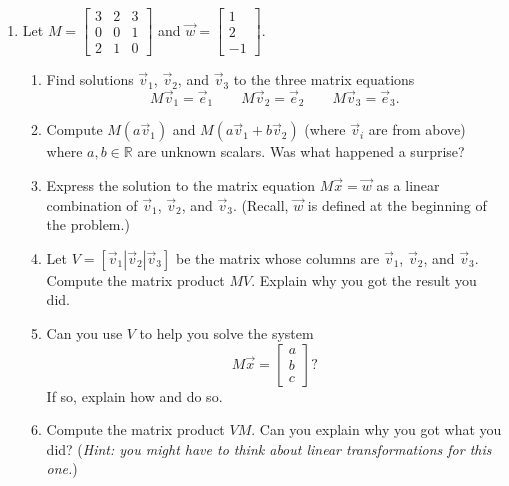 \documentclass[letter]{article}
\newcommand{\R}{\mathbb{R}}
\newcommand{\mat}[1]{\begin{bmatrix}#1\end{bmatrix}}
\begin{document}
\begin{enumerate}
		\item Let $M=\mat{3&2&3\\0&0&1\\2&1&0}$ and $\vec w=\mat{1\\2\\-1}$.
			\begin{enumerate}
				\item Find solutions $\vec v_1$, $\vec v_2$, and $\vec v_3$ to the three matrix
					equations
					\[
						M\vec v_1=\vec e_1\qquad M\vec v_2=\vec e_2\qquad M\vec v_3=\vec e_3.
					\]
				\item Compute $M(a\vec v_1)$ and $M(a\vec v_1+b\vec v_2)$ (where $\vec v_i$ are from above)
					where $a,b\in\R$ are unknown scalars.
					Was what happened a surprise?
				\item Express the solution to the matrix equation $M\vec x=\vec w$ as a linear combination
					of $\vec v_1$, $\vec v_2$, and $\vec v_3$.  (Recall, $\vec w$ is defined at the beginning
					of the problem.)
				\item Let $V=[\vec v_1|\vec v_2|\vec v_3]$ be the matrix whose columns are $\vec v_1$, $\vec v_2$,
					and $\vec v_3$.  Compute the matrix product $MV$.  Explain why you got the
					result you did.
				\item Can you use $V$ to help you solve the system
					\[
						M\vec x=\mat{a\\b\\c}?
					\]
					If so, explain how and do so.
				\item Compute the matrix product $VM$.  Can you explain why you got what you did?
					(\emph{Hint: you might have to think about linear transformations for this one.})
			\end{enumerate}


\end{enumerate}
\end{document}
